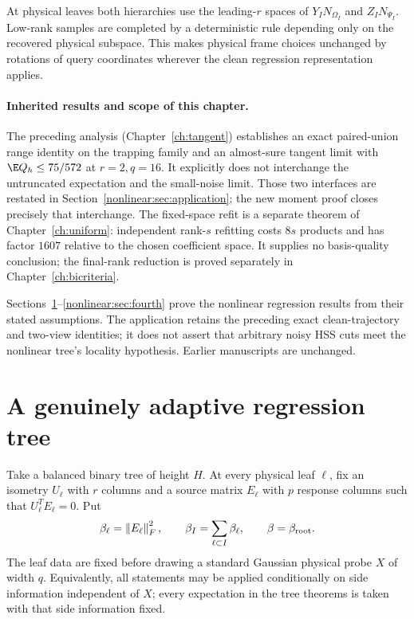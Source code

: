 \documentclass[11pt,oneside,openany,a4paper]{book}
\numberwithin{equation}{chapter}
\theoremstyle{definition}
\theoremstyle{remark}
\newcommand{\F}[1]{\left\lVert#1\right\rVert_F}
\begin{document}
At physical leaves both hierarchies use the leading-$r$ spaces of $Y_IN_{\Omega_I}$ and $Z_IN_{\Psi_I}$. Low-rank samples are completed by a deterministic rule depending only on the recovered physical subspace. This makes physical frame choices unchanged by rotations of query coordinates wherever the clean regression representation applies.

\paragraph{Inherited results and scope of this chapter.}
The preceding analysis (Chapter~\ref{ch:tangent}) establishes an exact paired-union range identity on the trapping family and an almost-sure tangent limit with $\E Q_h\le75/572$ at $r=2,q=16$. It explicitly does not interchange the untruncated expectation and the small-noise limit. Those two interfaces are restated in Section~\ref{nonlinear:sec:application}; the new moment proof closes precisely that interchange. The fixed-space refit is a separate theorem of Chapter~\ref{ch:uniform}: independent rank-$s$ refitting costs $8s$ products and has factor $1607$ relative to the chosen coefficient space. It supplies no basis-quality conclusion; the final-rank reduction is proved separately in Chapter~\ref{ch:bicriteria}.

Sections~\ref{nonlinear:sec:model}--\ref{nonlinear:sec:fourth} prove the nonlinear regression results from their stated assumptions. The application retains the preceding exact clean-trajectory and two-view identities; it does not assert that arbitrary noisy HSS cuts meet the nonlinear tree's locality hypothesis. Earlier manuscripts are unchanged.

\section{A genuinely adaptive regression tree}\label{nonlinear:sec:model}
Take a balanced binary tree of height $H$. At every physical leaf $\ell$, fix an isometry $U_\ell$ with $r$ columns and a source matrix $E_\ell$ with $p$ response columns such that $U_\ell^TE_\ell=0$. Put
\[
 \beta_\ell=\F{E_\ell}^2,\qquad
 \beta_I=\sum_{\ell\subset I}\beta_\ell,\qquad \beta=\beta_{\rm root}.
\]
The leaf data are fixed before drawing a standard Gaussian physical probe $X$ of width $q$. Equivalently, all statements may be applied conditionally on side information independent of $X$; every expectation in the tree theorems is taken with that side information fixed.
\end{document}
